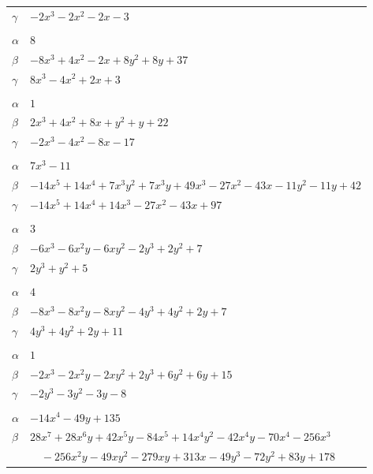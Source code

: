 \documentclass[11pt]{article}
\begin{document}
\begin{longtable}{@{}ll@{}}
$\gamma$ & $-2x^{3}-2x^{2}-2x-3$\\
\addlinespace[3pt]
\multicolumn{2}{@{}l}{$\{i,j\}=\{3,5\}$, $k_{ij}=3^{2}\cdot 5$}\\
$\alpha$ & $8$\\
$\beta$ & $-8x^{3}+4x^{2}-2x+8y^{2}+8y+37$\\
$\gamma$ & $8x^{3}-4x^{2}+2x+3$\\
\addlinespace[3pt]
\multicolumn{2}{@{}l}{$\{i,j\}=\{3,9\}$, $k_{ij}=2^{3}\cdot 5$}\\
$\alpha$ & $1$\\
$\beta$ & $2x^{3}+4x^{2}+8x+y^{2}+y+22$\\
$\gamma$ & $-2x^{3}-4x^{2}-8x-17$\\
\addlinespace[3pt]
\multicolumn{2}{@{}l}{$\{i,j\}=\{3,21\}$, $k_{ij}=2^{7}$}\\
$\alpha$ & $7x^{3}-11$\\
$\beta$ & $-14x^{5}+14x^{4}+7x^{3}y^{2}+7x^{3}y+49x^{3}-27x^{2}-43x-11y^{2}-11y+42$\\
$\gamma$ & $-14x^{5}+14x^{4}+14x^{3}-27x^{2}-43x+97$\\
\addlinespace[3pt]
\multicolumn{2}{@{}l}{$\{i,j\}=\{4,5\}$, $k_{ij}=3$}\\
$\alpha$ & $3$\\
$\beta$ & $-6x^{3}-6x^{2}y-6xy^{2}-2y^{3}+2y^{2}+7$\\
$\gamma$ & $2y^{3}+y^{2}+5$\\
\addlinespace[3pt]
\multicolumn{2}{@{}l}{$\{i,j\}=\{4,7\}$, $k_{ij}=3\cdot 5$}\\
$\alpha$ & $4$\\
$\beta$ & $-8x^{3}-8x^{2}y-8xy^{2}-4y^{3}+4y^{2}+2y+7$\\
$\gamma$ & $4y^{3}+4y^{2}+2y+11$\\
\addlinespace[3pt]
\multicolumn{2}{@{}l}{$\{i,j\}=\{4,11\}$, $k_{ij}=3^{2}$}\\
$\alpha$ & $1$\\
$\beta$ & $-2x^{3}-2x^{2}y-2xy^{2}+2y^{3}+6y^{2}+6y+15$\\
$\gamma$ & $-2y^{3}-3y^{2}-3y-8$\\
\addlinespace[3pt]
\multicolumn{2}{@{}l}{$\{i,j\}=\{4,16\}$, $k_{ij}=3^{3}\cdot 5$}\\
$\alpha$ & $-14x^{4}-49y+135$\\
$\beta$ & $28x^{7}+28x^{6}y+42x^{5}y-84x^{5}+14x^{4}y^{2}-42x^{4}y-70x^{4}-256x^{3}$\\
 & $\quad -256x^{2}y-49xy^{2}-279xy+313x-49y^{3}-72y^{2}+83y+178$\\

\end{longtable}
\end{document}
